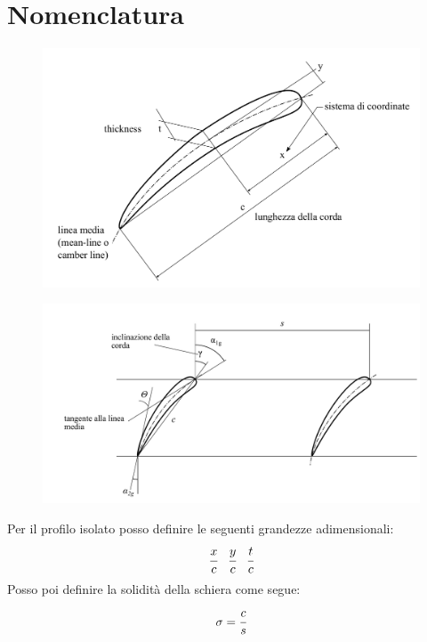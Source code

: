 \section{Nomenclatura}
\begin{figure}[h!]
\centering
\begin{minipage}{.5\textwidth}
  \centering
  \includegraphics[width=.9\linewidth]{fig/profiloDef.pdf}
  \label{}
\end{minipage}%
\begin{minipage}{.5\textwidth}
  \centering
  \includegraphics[width=.9\linewidth]{fig/schiera_2.pdf}
  \label{}
\end{minipage}
\end{figure}

Per il profilo isolato posso definire le seguenti grandezze adimensionali:
\begin{align*}
\cfrac{x}{c} \;\;\; \cfrac{y}{c} \;\;\; \cfrac{t}{c}
\end{align*}
Posso poi definire la solidità della schiera come segue:
\begin{equation}
\sigma = \cfrac{c}{s}
\end{equation}

